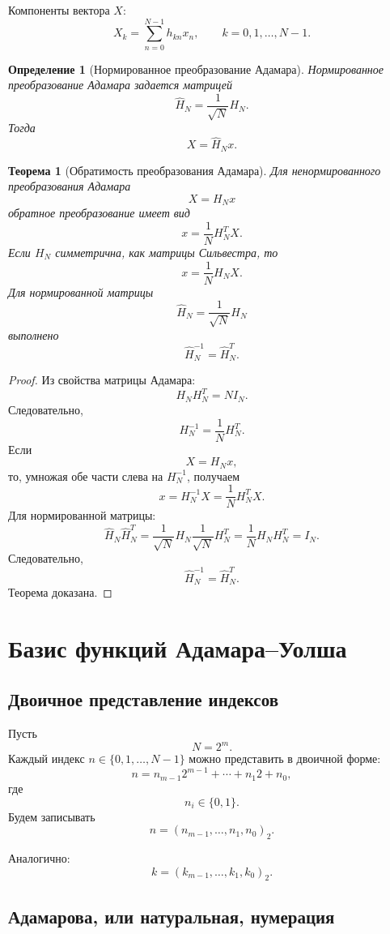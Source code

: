 \documentclass[12pt,a4paper]{article}
\newtheorem{definition}{Определение}
\newtheorem{theorem}{Теорема}
\begin{document}
Компоненты вектора $X$:
\[
    X_k = \sum_{n=0}^{N-1} h_{kn}x_n,
    \qquad k=0,1,\ldots,N-1.
\]

\begin{definition}[Нормированное преобразование Адамара]
Нормированное преобразование Адамара задается матрицей
\[
    \widehat{H}_N=\frac{1}{\sqrt{N}}H_N.
\]
Тогда
\[
    X=\widehat{H}_N x.
\]
\end{definition}

\begin{theorem}[Обратимость преобразования Адамара]
Для ненормированного преобразования Адамара
\[
    X=H_Nx
\]
обратное преобразование имеет вид
\[
    x=\frac{1}{N}H_N^T X.
\]
Если $H_N$ симметрична, как матрицы Сильвестра, то
\[
    x=\frac{1}{N}H_NX.
\]
Для нормированной матрицы
\[
    \widehat{H}_N=\frac{1}{\sqrt{N}}H_N
\]
выполнено
\[
    \widehat{H}_N^{-1}=\widehat{H}_N^T.
\]
\end{theorem}

\begin{proof}
Из свойства матрицы Адамара:
\[
    H_NH_N^T=NI_N.
\]
Следовательно,
\[
    H_N^{-1}=\frac{1}{N}H_N^T.
\]
Если
\[
    X=H_Nx,
\]
то, умножая обе части слева на $H_N^{-1}$, получаем
\[
    x=H_N^{-1}X=\frac{1}{N}H_N^TX.
\]
Для нормированной матрицы:
\[
    \widehat{H}_N\widehat{H}_N^T
    =
    \frac{1}{\sqrt{N}}H_N
    \frac{1}{\sqrt{N}}H_N^T
    =
    \frac{1}{N}H_NH_N^T
    =
    I_N.
\]
Следовательно,
\[
    \widehat{H}_N^{-1}=\widehat{H}_N^T.
\]
Теорема доказана.
\end{proof}

\section{Базис функций Адамара--Уолша}

\subsection{Двоичное представление индексов}

Пусть
\[
    N=2^m.
\]
Каждый индекс $n\in\{0,1,\ldots,N-1\}$ можно представить в двоичной форме:
\[
    n = n_{m-1}2^{m-1}+\cdots+n_1 2+n_0,
\]
где
\[
    n_i\in\{0,1\}.
\]
Будем записывать
\[
    n=(n_{m-1},\ldots,n_1,n_0)_2.
\]

Аналогично:
\[
    k=(k_{m-1},\ldots,k_1,k_0)_2.
\]

\subsection{Адамарова, или натуральная, нумерация}
\end{document}
